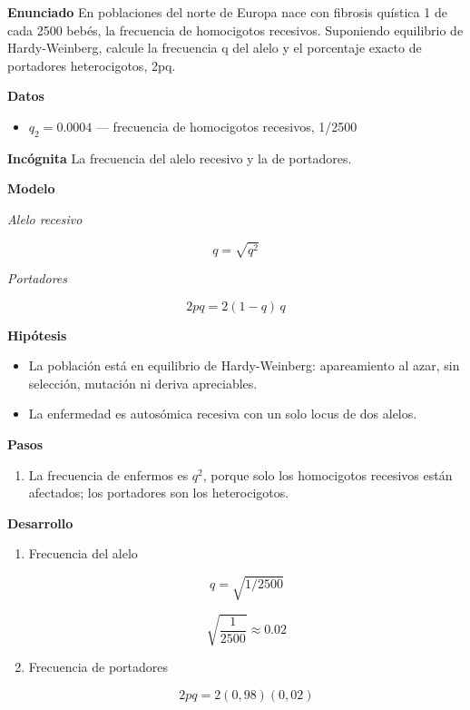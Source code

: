 \documentclass{book}
\begin{document}
\begin{tcolorbox}[title={Problema resuelto}, studiumworked, breakable]

\noindent\textbf{Enunciado}
En poblaciones del norte de Europa nace con fibrosis quística 1 de cada 2500 bebés, la frecuencia de homocigotos recesivos. Suponiendo equilibrio de Hardy-Weinberg, calcule la frecuencia q del alelo y el porcentaje exacto de portadores heterocigotos, 2pq.


\noindent\textbf{Datos}
\begin{itemize}
\item $q_{2} = 0.0004$ — frecuencia de homocigotos recesivos, 1/2500
\end{itemize}

\noindent\textbf{Incógnita}
La frecuencia del alelo recesivo y la de portadores.


\noindent\textbf{Modelo}

\noindent\textit{Alelo recesivo}

\[
q = \sqrt{q^{2}}
\]

\noindent\textit{Portadores}

\[
2pq = 2(1-q)\,q
\]

\noindent\textbf{Hipótesis}
\begin{itemize}
\item La población está en equilibrio de Hardy-Weinberg: apareamiento al azar, sin selección, mutación ni deriva apreciables.
\item La enfermedad es autosómica recesiva con un solo locus de dos alelos.
\end{itemize}

\noindent\textbf{Pasos}
\begin{enumerate}
\item
La frecuencia de enfermos es \(q^{2}\), porque solo los homocigotos recesivos están afectados; los portadores son los heterocigotos.

\end{enumerate}

\noindent\textbf{Desarrollo}
\begin{enumerate}
\item
Frecuencia del alelo


\[
q = \sqrt{1/2500}
\]

\[
\sqrt{\frac{1}{2500}} \approx 0.02
\]
\item
Frecuencia de portadores


\[
2pq = 2(0{,}98)(0{,}02)
\]


\end{enumerate}
\end{tcolorbox}
\end{document}
